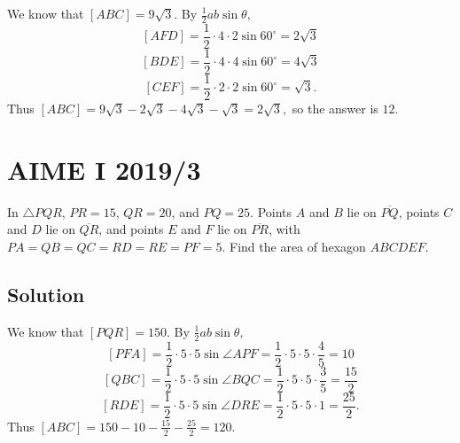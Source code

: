 \documentclass{article}
\begin{document}
We know that $[ABC]=9\sqrt{3}.$ By $\frac{1}{2}ab\sin\theta,$
\[[AFD]=\frac{1}{2}\cdot 4\cdot 2\sin 60^{\circ}=2\sqrt{3}\]
\[[BDE]=\frac{1}{2}\cdot 4\cdot 4\sin 60^{\circ}=4\sqrt{3}\]
\[[CEF]=\frac{1}{2}\cdot 2\cdot 2\sin 60^{\circ}=\sqrt{3}.\]
Thus $[ABC]=9\sqrt{3}-2\sqrt{3}-4\sqrt{3}-\sqrt{3}=2\sqrt{3},$ so the answer is $12.$

\begin{center}
\end{center}

\pagebreak\section{AIME I 2019/3}
In $\triangle PQR$, $PR=15$, $QR=20$, and $PQ=25$. Points $A$ and $B$ lie on $\overline{PQ}$, points $C$ and $D$ lie on $\overline{QR}$, and points $E$ and $F$ lie on $\overline{PR}$, with $PA=QB=QC=RD=RE=PF=5$. Find the area of hexagon $ABCDEF$.

\subsection{Solution}
We know that $[PQR]=150.$ By $\frac{1}{2}ab\sin\theta,$
\[[PFA]=\frac{1}{2}\cdot 5\cdot 5\sin \angle APF=\frac{1}{2}\cdot 5\cdot 5\cdot\frac{4}{5}=10\]
\[[QBC]=\frac{1}{2}\cdot 5\cdot 5\sin \angle BQC=\frac{1}{2}\cdot 5\cdot 5\cdot \frac{3}{5}=\frac{15}{2}\]
\[[RDE]=\frac{1}{2}\cdot 5\cdot 5\sin \angle DRE=\frac{1}{2}\cdot 5\cdot 5\cdot 1=\frac{25}{2}.\]
Thus $[ABC]=150-10-\frac{15}{2}-\frac{25}{2}=120.$
\end{document}
